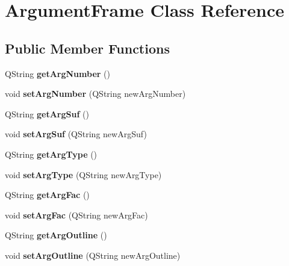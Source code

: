 \hypertarget{classArgumentFrame}{\section{Argument\+Frame Class Reference}
\label{classArgumentFrame}
}
\subsection*{Public Member Functions}
\begin{DoxyCompactItemize}
\item 
\hypertarget{classArgumentFrame_a078f53c29943421581053f45eef1138a}{Q\+String {\bfseries get\+Arg\+Number} ()}\label{classArgumentFrame_a078f53c29943421581053f45eef1138a}

\item 
\hypertarget{classArgumentFrame_af18e760bf2a9d9c1c663742fd378cf89}{void {\bfseries set\+Arg\+Number} (Q\+String new\+Arg\+Number)}\label{classArgumentFrame_af18e760bf2a9d9c1c663742fd378cf89}

\item 
\hypertarget{classArgumentFrame_aa3f6b9a043f92570c01fc63bc2ec082c}{Q\+String {\bfseries get\+Arg\+Suf} ()}\label{classArgumentFrame_aa3f6b9a043f92570c01fc63bc2ec082c}

\item 
\hypertarget{classArgumentFrame_afc8b164e67cb7eab93cf6e85b847176f}{void {\bfseries set\+Arg\+Suf} (Q\+String new\+Arg\+Suf)}\label{classArgumentFrame_afc8b164e67cb7eab93cf6e85b847176f}

\item 
\hypertarget{classArgumentFrame_a7490cff5cada50746f9f5aab061ac396}{Q\+String {\bfseries get\+Arg\+Type} ()}\label{classArgumentFrame_a7490cff5cada50746f9f5aab061ac396}

\item 
\hypertarget{classArgumentFrame_a2d18e376c85b15296108ddb3135052a1}{void {\bfseries set\+Arg\+Type} (Q\+String new\+Arg\+Type)}\label{classArgumentFrame_a2d18e376c85b15296108ddb3135052a1}

\item 
\hypertarget{classArgumentFrame_aab5a56938a83beecedf1c0e8a4cd04fe}{Q\+String {\bfseries get\+Arg\+Fac} ()}\label{classArgumentFrame_aab5a56938a83beecedf1c0e8a4cd04fe}

\item 
\hypertarget{classArgumentFrame_ac0f0e26ee22afe6b091c67e4c23c5657}{void {\bfseries set\+Arg\+Fac} (Q\+String new\+Arg\+Fac)}\label{classArgumentFrame_ac0f0e26ee22afe6b091c67e4c23c5657}

\item 
\hypertarget{classArgumentFrame_a4c298cd5165a191b2ad1a75c96994c32}{Q\+String {\bfseries get\+Arg\+Outline} ()}\label{classArgumentFrame_a4c298cd5165a191b2ad1a75c96994c32}

\item 
\hypertarget{classArgumentFrame_a73f63181a96c7c67ac3452b792359292}{void {\bfseries set\+Arg\+Outline} (Q\+String new\+Arg\+Outline)}\label{classArgumentFrame_a73f63181a96c7c67ac3452b792359292}

\end{DoxyCompactItemize}



